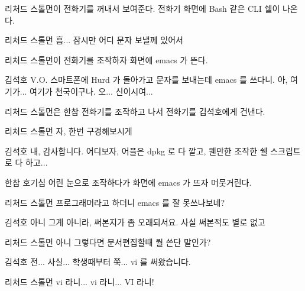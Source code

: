 \documentclass{screenplay}
\begin{document}
    리처드 스톨먼이 전화기를 꺼내서 보여준다. 전화기 화면에 Bash 같은 CLI 쉘이 나온다.
    
    \begin{dialogue}{리처드 스톨먼}
        흠... 잠시만 어디 문자 보낼께 있어서
    \end{dialogue}
    
    
    리처드 스톨먼이 전화기를 조작하자 화면에 emacs 가 뜬다.
    
    \begin{dialogue}{김석호}
        V.O. 스마트폰에 Hurd 가 돌아가고 문자를 보내는데 emacs 를 쓰다니. 아, 여기가... 여기가 천국이구나. 오... 신이시여...
    \end{dialogue}
    
    
    리처드 스톨먼은 한참 전화기를 조작하고 나서 전화기를 김석호에게 건낸다.
    
    \begin{dialogue}{리처드 스톨먼}
        자, 한번 구경해보시게
    \end{dialogue}
    \begin{dialogue}{김석호}
        내, 감사합니다. 어디보자, 어플은 dpkg 로 다 깔고, 웬만한 조작한 쉘 스크립트로 다 하고...
    \end{dialogue}
    
    한참 호기심 어린 눈으로 조작하다가 화면에 emacs 가 뜨자 머뭇거린다.
    
    \begin{dialogue}{리처드 스톨먼}
        프로그래머라고 하더니 emacs 를 잘 못쓰나보네?
    \end{dialogue}
    \begin{dialogue}{김석호}
        아니 그게 아니라, 써본지가 좀 오래되서요.
        사실 써본적도 별로 없고
    \end{dialogue}
    \begin{dialogue}{리처드 스톨먼}
        아니 그렇다면 문서편집할때 뭘 쓴단 말인가?
    \end{dialogue}
    \begin{dialogue}[난처해하며]{김석호}
        전... 사실... 학생때부터 쭉... vi 를 써왔습니다.
    \end{dialogue}
    \begin{dialogue}[놀라며]{리처드 스톨먼}
        vi 라니... vi 라니...
        VI 라니!
    \end{dialogue}
    
\end{document}
